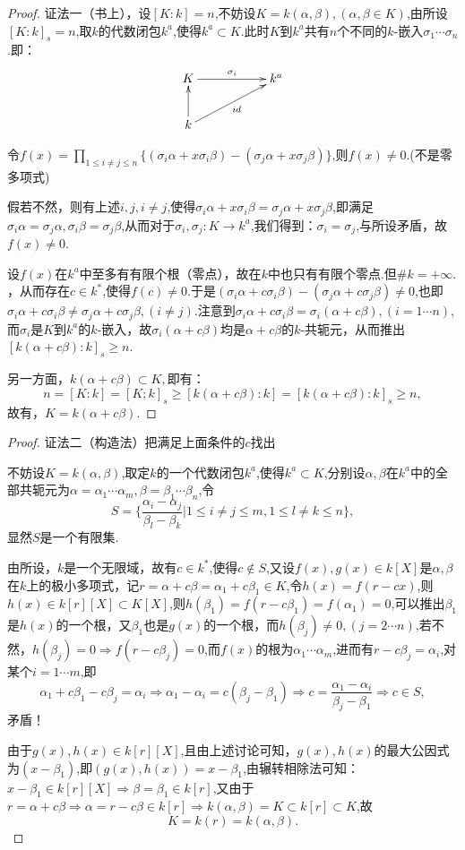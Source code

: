 \documentclass[UTF8]{article}
\begin{document}
\begin{proof}
证法一（书上），设$[K:k]=n$,不妨设$K=k(\alpha,\beta),(\alpha,\beta\in K)$,由所设$[K:k]_s=n$,取$k$的代数闭包$k^a$,使得$k^a\subset K$.此时$K$到$k^a$共有$n$个不同的$k$-嵌入$\sigma_1\cdots\sigma_n$.即：$$
\xymatrix{K\ar[rr]^{\sigma_i }&&k^a\\k\ar[u]\ar[rru]_{id}& }$$

令$f(x)=\prod_{1\le i\ne j\le n}\{(\sigma_i\alpha + x\sigma_i\beta)-(\sigma_j\alpha + x\sigma_j\beta)\}$,则$f(x)\ne 0$.(不是零多项式)

假若不然，则有上述$i,j,i\ne j$,使得$\sigma_i\alpha + x\sigma_i\beta=\sigma_j\alpha + x\sigma_j\beta$,即满足$\sigma_i\alpha=\sigma_j\alpha,\sigma_i\beta=\sigma_j\beta$,从而对于$\sigma_i,\sigma_j:K\rightarrow k^a$,我们得到：$\sigma_i=\sigma_j$,与所设矛盾，故$f(x)\ne 0$.

设$f(x)$在$k^a$中至多有有限个根（零点），故在$k$中也只有有限个零点.但$\#k= +\infty.$，从而存在$c\in k^*$,使得$f(c)\ne0$.于是$(\sigma_i\alpha + c\sigma_i\beta)-(\sigma_j\alpha + c\sigma_j\beta)\ne0$,也即$\sigma_i\alpha + c\sigma_i\beta\ne \sigma_j\alpha + c\sigma_j\beta,(i\ne j)$.注意到$\sigma_i\alpha + c\sigma_i\beta=\sigma_i(\alpha+ c\beta),(i=1\cdots n)$,而$\sigma_i$是$K$到$k^a$的$k$-嵌入，故$\sigma_i(\alpha+ c\beta)$均是$\alpha+ c\beta$的$k$-共轭元，从而推出$[k(\alpha+c\beta):k]_s\ge n$.

另一方面，$k(\alpha+c\beta)\subset K,$即有：$$n=[K:k]=[K;k]_s\ge[k(\alpha+c\beta):k]=[k(\alpha+c\beta):k]_s\ge n,$$故有，$K=k(\alpha+c\beta)$. 
\end{proof}

\begin{proof}
证法二（构造法）把满足上面条件的$c$找出

不妨设$K=k(\alpha,\beta)$,取定$k$的一个代数闭包$k^a$,使得$k^a\subset K$,分别设$\alpha,\beta$在$k^a$中的全部共轭元为$\alpha=\alpha_1\cdots \alpha_m,\beta=\beta_1\cdots\beta_n$,令$$S=\{\frac{\alpha_i-\alpha_j}{\beta_l-\beta_k}|1\le i\ne j\le m,1\le l\ne k\le n\},$$显然$S$是一个有限集.

由所设，$k$是一个无限域，故有$c\in k^*$,使得$c\notin S$,又设$f(x),g(x)\in k[X]$是$\alpha,\beta$在$k$上的极小多项式，记$r=\alpha+c\beta=\alpha_1+c\beta_1\in K$,令$h(x)=f(r-cx)$,则$h(x)\in{k[r][X]}\subset K[X]$,则$h(\beta_1)=f(r - c\beta_1)=f(\alpha_1)=0$,可以推出$\beta_1$是$h(x)$的一个根，又$\beta_1$也是$g(x)$的一个根，而$h(\beta_j)\ne 0,(j=2\cdots n)$,若不然，$h(\beta_j)=0\Rightarrow f(r-c\beta_j)=0$,而$f(x)$的根为$\alpha_1\cdots \alpha_m$,进而有$r-c\beta_j=\alpha_i$,对某个$i=1\cdots m$,即$$\alpha_1+ c\beta_1-c\beta_j=\alpha_i\Rightarrow \alpha_1-\alpha_i=c(\beta_j-\beta_1)\Rightarrow c=\frac{\alpha_1-\alpha_i}{\beta_j-\beta_1}\Rightarrow c\in S,$$矛盾！

由于$g(x),h(x)\in k[r][X]$,且由上述讨论可知，$g(x),h(x)$的最大公因式为$(x-\beta_1)$,即$(g(x),h(x))=x-\beta_1$,由辗转相除法可知：$x-\beta_1\in k[r][X]\Rightarrow \beta=\beta_1\in k[r]$,又由于$r=\alpha+c\beta\Rightarrow \alpha=r-c\beta\in k[r]\Rightarrow k(\alpha,\beta)=K\subset k[r]\subset K$,故$$K=k(r)=k(\alpha,\beta).$$
\end{proof}
\end{document}
